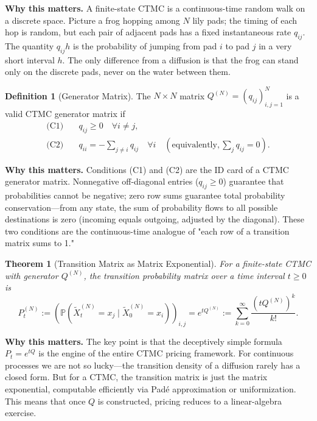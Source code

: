 \documentclass[11pt,a4paper,openany]{book}
\theoremstyle{definition}
\newtheorem{definition}{Definition}[chapter]
\theoremstyle{plain}
\newtheorem{theorem}{Theorem}[chapter]
\theoremstyle{remark}
\newcommand{\1}{\mathbbm{1}}
\newcommand{\Pbb}{\mathbb{P}}
\begin{document}
\medskip
\noindent\textbf{Why this matters.} A finite-state CTMC is a continuous-time random walk on a discrete space. Picture a frog hopping among $N$ lily pads; the timing of each hop is random, but each pair of adjacent pads has a fixed instantaneous rate $q_{ij}$. The quantity $q_{ij} h$ is the probability of jumping from pad $i$ to pad $j$ in a very short interval $h$. The only difference from a diffusion is that the frog can stand only on the discrete pads, never on the water between them.

\begin{definition}[Generator Matrix]
The $N \times N$ matrix $Q^{(N)} = (q_{ij})_{i,j=1}^{N}$ is a valid CTMC generator matrix if
\begin{align}
\text{(C1)} &\quad q_{ij} \geq 0 \quad \forall i \neq j, \\
\text{(C2)} &\quad q_{ii} = -\sum_{j \neq i} q_{ij} \quad \forall i \quad (\text{equivalently}, \sum_{j} q_{ij} = 0).
\end{align}
\end{definition}

\medskip
\noindent\textbf{Why this matters.} Conditions (C1) and (C2) are the ID card of a CTMC generator matrix. Nonnegative off-diagonal entries ($q_{ij} \ge 0$) guarantee that probabilities cannot be negative; zero row sums guarantee total probability conservation---from any state, the sum of probability flows to all possible destinations is zero (incoming equals outgoing, adjusted by the diagonal). These two conditions are the continuous-time analogue of "each row of a transition matrix sums to 1."

\begin{theorem}[Transition Matrix as Matrix Exponential]
For a finite-state CTMC with generator $Q^{(N)}$, the transition probability matrix over a time interval $t \geq 0$ is
\[
P_{t}^{(N)} := \left(\Pbb(\widetilde{X}_{t}^{(N)} = x_{j} \mid \widetilde{X}_{0}^{(N)} = x_{i})\right)_{i,j} = e^{t Q^{(N)}} := \sum_{k=0}^{\infty} \frac{(t Q^{(N)})^{k}}{k!}.
\]
\end{theorem}

\medskip
\noindent\textbf{Why this matters.} The key point is that the deceptively simple formula $P_t = e^{tQ}$ is the engine of the entire CTMC pricing framework. For continuous processes we are not so lucky---the transition density of a diffusion rarely has a closed form. But for a CTMC, the transition matrix is just the matrix exponential, computable efficiently via Pad\'e approximation or uniformization. This means that once $Q$ is constructed, pricing reduces to a linear-algebra exercise.
\end{document}
